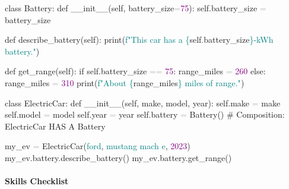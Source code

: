 \documentclass[
  justified,
  openright,
]{tufte-book}
\let\subsubsection\paragraph
\let\paragraph\paragraph
\newcommand{\BuiltInTok}[1]{#1}
\newcommand{\CommentTok}[1]{\textcolor{MidGray}{#1}}
\newcommand{\ControlFlowTok}[1]{\textcolor{BrandBlue}{#1}}
\newcommand{\DecValTok}[1]{\textcolor{Purple}{#1}}
\newcommand{\FunctionTok}[1]{\textcolor{BrandBlue}{#1}}
\newcommand{\KeywordTok}[1]{\textcolor{BrandBlue}{#1}}
\newcommand{\NormalTok}[1]{#1}
\newcommand{\OperatorTok}[1]{\textcolor{DarkGray}{#1}}
\newcommand{\SpecialCharTok}[1]{\textcolor{Teal}{#1}}
\newcommand{\SpecialStringTok}[1]{\textcolor{Teal}{#1}}
\newcommand{\StringTok}[1]{\textcolor{Teal}{#1}}
\newcommand{\VariableTok}[1]{#1}
\newenvironment{Shaded}{%
  \begin{snugshade}
}{%
  \end{snugshade}
}
\let\subsubsection\paragraph
\let\paragraph\paragraph
\begin{document}
\begin{Shaded}
\begin{Highlighting}[]
\KeywordTok{class}\NormalTok{ Battery:}
    \KeywordTok{def} \FunctionTok{\_\_init\_\_}\NormalTok{(}\VariableTok{self}\NormalTok{, battery\_size}\OperatorTok{=}\DecValTok{75}\NormalTok{):}
        \VariableTok{self}\NormalTok{.battery\_size }\OperatorTok{=}\NormalTok{ battery\_size}

    \KeywordTok{def}\NormalTok{ describe\_battery(}\VariableTok{self}\NormalTok{):}
        \BuiltInTok{print}\NormalTok{(}\SpecialStringTok{f"This car has a }\SpecialCharTok{\{}\VariableTok{self}\SpecialCharTok{.}\NormalTok{battery\_size}\SpecialCharTok{\}}\SpecialStringTok{{-}kWh battery."}\NormalTok{)}

    \KeywordTok{def}\NormalTok{ get\_range(}\VariableTok{self}\NormalTok{):}
        \ControlFlowTok{if} \VariableTok{self}\NormalTok{.battery\_size }\OperatorTok{==} \DecValTok{75}\NormalTok{:}
\NormalTok{            range\_miles }\OperatorTok{=} \DecValTok{260}
        \ControlFlowTok{else}\NormalTok{:}
\NormalTok{            range\_miles }\OperatorTok{=} \DecValTok{310}
        \BuiltInTok{print}\NormalTok{(}\SpecialStringTok{f"About }\SpecialCharTok{\{}\NormalTok{range\_miles}\SpecialCharTok{\}}\SpecialStringTok{ miles of range."}\NormalTok{)}


\KeywordTok{class}\NormalTok{ ElectricCar:}
    \KeywordTok{def} \FunctionTok{\_\_init\_\_}\NormalTok{(}\VariableTok{self}\NormalTok{, make, model, year):}
        \VariableTok{self}\NormalTok{.make }\OperatorTok{=}\NormalTok{ make}
        \VariableTok{self}\NormalTok{.model }\OperatorTok{=}\NormalTok{ model}
        \VariableTok{self}\NormalTok{.year }\OperatorTok{=}\NormalTok{ year}
        \VariableTok{self}\NormalTok{.battery }\OperatorTok{=}\NormalTok{ Battery()   }\CommentTok{\# Composition: ElectricCar HAS A Battery}


\NormalTok{my\_ev }\OperatorTok{=}\NormalTok{ ElectricCar(}\StringTok{\textquotesingle{}ford\textquotesingle{}}\NormalTok{, }\StringTok{\textquotesingle{}mustang mach e\textquotesingle{}}\NormalTok{, }\DecValTok{2023}\NormalTok{)}
\NormalTok{my\_ev.battery.describe\_battery()}
\NormalTok{my\_ev.battery.get\_range()}
\end{Highlighting}
\end{Shaded}

\subsubsection{Skills Checklist}\label{skills-checklist-36}
\end{document}

